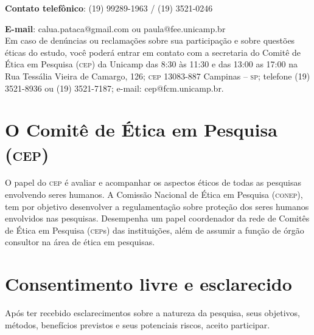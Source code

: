 \documentclass[a4paper,11pt,titlepage,singlespacing]{article}
\begin{document}
\noindent \textbf{Contato telefônico}: (19) 99289-1963 / (19) 3521-0246

\noindent \textbf{E-mail}: calua.pataca@gmail.com ou paula@fee.unicamp.br \\

\noindent Em caso de denúncias ou reclamações sobre sua participação e sobre questões éticas do estudo,
você poderá entrar em contato com a secretaria do Comitê de Ética em Pesquisa (\textsc{cep}) da Unicamp das 8:30 às 11:30 e das 13:00 as 17:00 na Rua Tessália Vieira de Camargo, 126; \textsc{cep} 13083-887 Campinas – 
\textsc{sp}; telefone (19) 3521-8936 ou (19) 3521-7187; e-mail: cep@fcm.unicamp.br.

\section*{O Comitê de Ética em Pesquisa \textsc{(cep)}}

\noindent O papel do \textsc{cep} é avaliar e acompanhar os aspectos éticos de todas as pesquisas envolvendo seres humanos. A Comissão Nacional de Ética em Pesquisa (\textsc{conep}), tem por objetivo desenvolver a regulamentação sobre proteção dos seres humanos
envolvidos nas pesquisas. Desempenha um papel coordenador da rede de Comitês de
Ética em Pesquisa (\textsc{cep}s) das instituições, além de assumir a função de órgão
consultor na área de ética em pesquisas.

\section*{Consentimento livre e esclarecido}

\noindent Após ter recebido esclarecimentos sobre a natureza da pesquisa, seus objetivos, métodos, benefícios
previstos e seus potenciais riscos, aceito participar.


\end{document}
